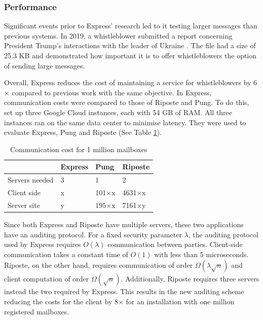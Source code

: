 \documentclass[a4paper]{article}
\begin{document}
\subsubsection{Performance}
Significant events prior to Express' research led to it testing larger messages than previous systems. In 2019, a whistleblower submitted a report concerning President Trump's interactions with the leader of Ukraine \citep{WhistleblowerComplaint}. The file had a size of 25.3 KB and demonstrated how important it is to offer whistleblowers the option of sending large messages.

Overall, Express reduces the cost of maintaining a service for whistleblowers by 6$\times$ compared to previous work with the same objective.
In Express, communication costs were compared to those of Riposte and Pung. To do this, \citet{Eskandarian2021} set up three Google Cloud instances, each with 54 GB of RAM. All three instances ran on the same data center to minimise latency. They were used to evaluate Express, Pung and Riposte (See Table \ref{tab:communication}).

\begin{table}[h!]
\centering
\caption{Communication cost for 1 million mailboxes}
\label{tab:communication}
\begin{tabular}{llll}
\hline
 & Express & Pung & Riposte \\ \hline
Servers needed                             & 3       & 1     & 2       \\ \hline
Client side                                & x       & 101$\times$x & 4631$\times$x  \\ \hline
Server site                                & y       & 195$\times$x & 7161$\times$y  \\ \hline
\end{tabular}
\end{table}

Since both Express and Riposte have multiple servers, these two applications have an auditing protocol. For a fixed security parameter $\lambda$, the auditing protocol used by Express requires $O(\lambda)$ communication between parties. Client-side communication takes a constant time of $O(1)$ with less than 5 microseconds. Riposte, on the other hand, requires communication of order $\Omega (\lambda \sqrt{n})$ and client computation of order $\Omega (\sqrt{n})$. Additionally, Riposte requires three servers instead the two required by Express. This results in the new auditing scheme reducing the costs for the client by 8$\times$ for an installation with one million registered mailboxes. 
\end{document}
